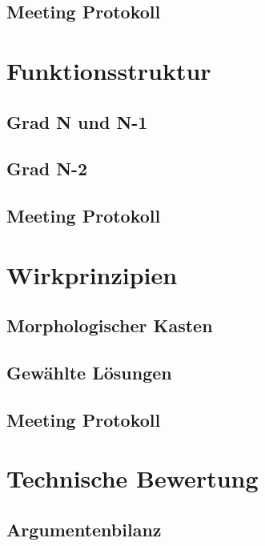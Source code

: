 \documentclass[10pt,a4paper]{article}
\begin{document}
\subsection{Meeting Protokoll}
\section{Funktionsstruktur}
\subsection{Grad N und N-1}
\subsection{Grad N-2}
\subsection{Meeting Protokoll}
\section{Wirkprinzipien}
\subsection{Morphologischer Kasten}
\subsection{Gewählte Lösungen}
\subsection{Meeting Protokoll}
\newpage
\section{Technische Bewertung}
\subsection{Argumentenbilanz}
\end{document}
